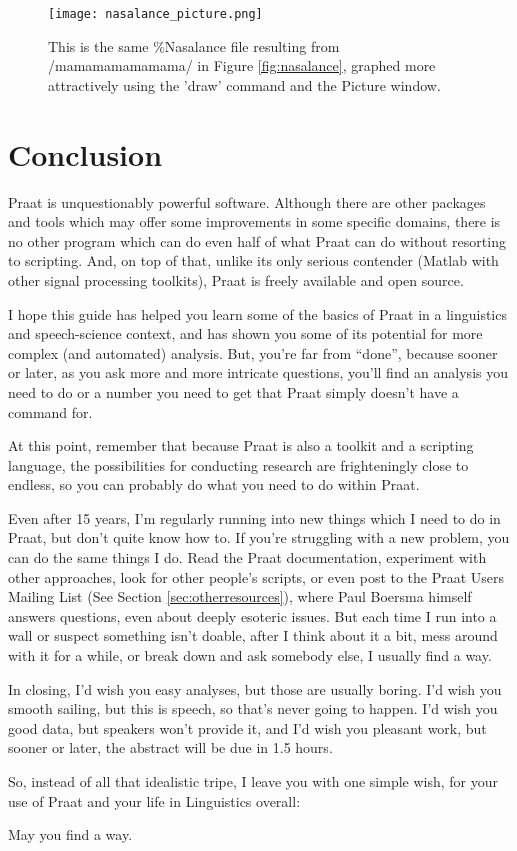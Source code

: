 \documentclass[11pt]{article}
\begin{document}
\begin{figure}
  \centerline{
    \mbox{\texttt{[image: nasalance\_picture.png]}}
  }
  \caption{This is the same \%Nasalance file resulting from /mamamamamamama/ in Figure \ref{fig:nasalance}, graphed more attractively using the 'draw' command and the Picture window.}
  \label{fig:nasalancepretty}
  \end{figure}

\pagebreak

\hypertarget{conclusion}{%
\section{Conclusion}\label{conclusion}}

\label{conclusion}

Praat is unquestionably powerful software. Although there are other
packages and tools which may offer some improvements in some specific
domains, there is no other program which can do even half of what Praat
can do without resorting to scripting. And, on top of that, unlike its
only serious contender (Matlab with other signal processing toolkits),
Praat is freely available and open source.

I hope this guide has helped you learn some of the basics of Praat in a
linguistics and speech-science context, and has shown you some of its
potential for more complex (and automated) analysis. But, you're far
from ``done'', because sooner or later, as you ask more and more
intricate questions, you'll find an analysis you need to do or a number
you need to get that Praat simply doesn't have a command for.

At this point, remember that because Praat is also a toolkit and a
scripting language, the possibilities for conducting research are
frighteningly close to endless, so you can probably do what you need to
do within Praat.

Even after 15 years, I'm regularly running into new things which I need
to do in Praat, but don't quite know how to. If you're struggling with a
new problem, you can do the same things I do. Read the Praat
documentation, experiment with other approaches, look for other people's
scripts, or even post to the Praat Users Mailing List (See Section
\ref{sec:otherresources}), where Paul Boersma himself answers questions,
even about deeply esoteric issues. But each time I run into a wall or
suspect something isn't doable, after I think about it a bit, mess
around with it for a while, or break down and ask somebody else, I
usually find a way.

In closing, I'd wish you easy analyses, but those are usually boring.
I'd wish you smooth sailing, but this is speech, so that's never going
to happen. I'd wish you good data, but speakers won't provide it, and
I'd wish you pleasant work, but sooner or later, the abstract will be
due in 1.5 hours.

So, instead of all that idealistic tripe, I leave you with one simple
wish, for your use of Praat and your life in Linguistics overall:

May you find a way.
\pagebreak

                                                     

\end{document}
